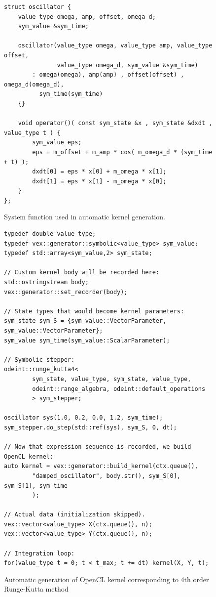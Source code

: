 \documentclass[1p]{elsarticle}
\begin{document}
\begin{figure}
\begin{lstlisting}
struct oscillator {
    value_type omega, amp, offset, omega_d;
    sym_value &sym_time;

    oscillator(value_type omega, value_type amp, value_type offset,
               value_type omega_d, sym_value &sym_time)
        : omega(omega), amp(amp) , offset(offset) , omega_d(omega_d),
          sym_time(sym_time)
    {}

    void operator()( const sym_state &x , sym_state &dxdt , value_type t ) {
        sym_value eps;
        eps = m_offset + m_amp * cos( m_omega_d * (sym_time + t) );
        dxdt[0] = eps * x[0] + m_omega * x[1];
        dxdt[1] = eps * x[1] - m_omega * x[0];
    }
};
\end{lstlisting}
\caption{System function used in automatic kernel generation.}
\label{code:symsysfunc}
\end{figure}

\begin{figure}
\begin{lstlisting}
typedef double value_type;
typedef vex::generator::symbolic<value_type> sym_value;
typedef std::array<sym_value,2> sym_state;

// Custom kernel body will be recorded here:
std::ostringstream body;
vex::generator::set_recorder(body);

// State types that would become kernel parameters:
sym_state sym_S = {sym_value::VectorParameter, sym_value::VectorParameter};
sym_value sym_time(sym_value::ScalarParameter);

// Symbolic stepper:
odeint::runge_kutta4<
        sym_state, value_type, sym_state, value_type,
        odeint::range_algebra, odeint::default_operations
        > sym_stepper;

oscillator sys(1.0, 0.2, 0.0, 1.2, sym_time);
sym_stepper.do_step(std::ref(sys), sym_S, 0, dt);

// Now that expression sequence is recorded, we build OpenCL kernel:
auto kernel = vex::generator::build_kernel(ctx.queue(),
        "damped_oscillator", body.str(), sym_S[0], sym_S[1], sym_time
        );

// Actual data (initialization skipped).
vex::vector<value_type> X(ctx.queue(), n);
vex::vector<value_type> Y(ctx.queue(), n);

// Integration loop:
for(value_type t = 0; t < t_max; t += dt) kernel(X, Y, t);
\end{lstlisting}
\caption{Automatic generation of OpenCL kernel corresponding to 4th order
Runge-Kutta method}
\label{code:krnbuilder}
\end{figure}
\end{document}
